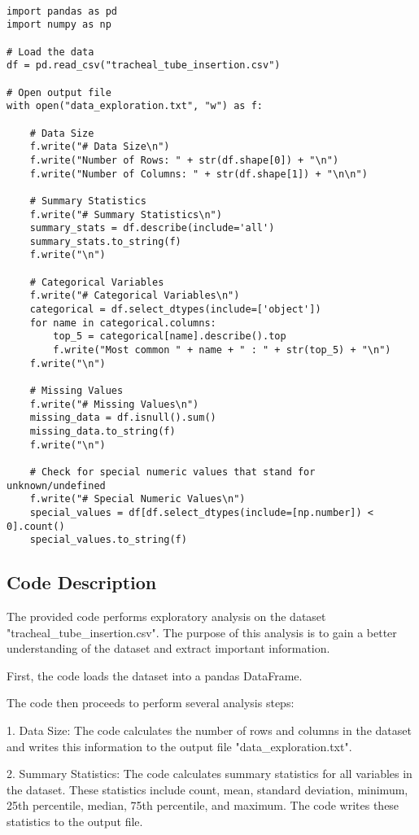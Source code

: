 \documentclass[11pt]{article}
\begin{document}
\begin{verbatim}

import pandas as pd
import numpy as np

# Load the data
df = pd.read_csv("tracheal_tube_insertion.csv")

# Open output file
with open("data_exploration.txt", "w") as f:

    # Data Size
    f.write("# Data Size\n")
    f.write("Number of Rows: " + str(df.shape[0]) + "\n")
    f.write("Number of Columns: " + str(df.shape[1]) + "\n\n")

    # Summary Statistics
    f.write("# Summary Statistics\n")
    summary_stats = df.describe(include='all')
    summary_stats.to_string(f)
    f.write("\n")

    # Categorical Variables
    f.write("# Categorical Variables\n")
    categorical = df.select_dtypes(include=['object'])
    for name in categorical.columns:
        top_5 = categorical[name].describe().top
        f.write("Most common " + name + " : " + str(top_5) + "\n")
    f.write("\n")

    # Missing Values
    f.write("# Missing Values\n")
    missing_data = df.isnull().sum()
    missing_data.to_string(f)
    f.write("\n")

    # Check for special numeric values that stand for unknown/undefined 
    f.write("# Special Numeric Values\n")
    special_values = df[df.select_dtypes(include=[np.number]) < 0].count()
    special_values.to_string(f)

\end{verbatim}

\subsection{Code Description}

The provided code performs exploratory analysis on the dataset "tracheal\_tube\_insertion.csv". The purpose of this analysis is to gain a better understanding of the dataset and extract important information.

First, the code loads the dataset into a pandas DataFrame. 

The code then proceeds to perform several analysis steps:

1. Data Size: The code calculates the number of rows and columns in the dataset and writes this information to the output file "data\_exploration.txt".

2. Summary Statistics: The code calculates summary statistics for all variables in the dataset. These statistics include count, mean, standard deviation, minimum, 25th percentile, median, 75th percentile, and maximum. The code writes these statistics to the output file.
\end{document}
